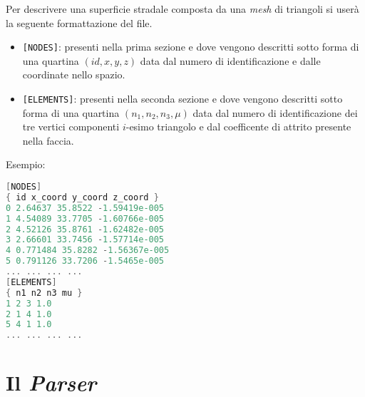 Per descrivere una superficie stradale composta da una \textit{mesh} di triangoli si userà la seguente formattazione del file.
\begin{itemize}
	\item \texttt{[NODES]}: presenti nella prima sezione e dove vengono descritti sotto forma di una quartina $(id,x,y,z)$ data dal numero di identificazione e dalle coordinate nello spazio.
	\item \texttt{[ELEMENTS]}: presenti nella seconda sezione e dove vengono descritti sotto forma di una quartina $(n_1,n_2,n_3,\mu)$ data dal numero di identificazione dei tre vertici componenti $i$-esimo triangolo e dal coefficente di attrito presente nella faccia.
\end{itemize}
Esempio:
\begin{lstlisting}[language = C++, basicstyle=\ttfamily\small, basewidth=0.55em]
[NODES]
{ id x_coord y_coord z_coord }
0 2.64637 35.8522 -1.59419e-005 
1 4.54089 33.7705 -1.60766e-005 
2 4.52126 35.8761 -1.62482e-005 
3 2.66601 33.7456 -1.57714e-005 
4 0.771484 35.8282 -1.56367e-005 
5 0.791126 33.7206 -1.5465e-005
... ... ... ...
[ELEMENTS]
{ n1 n2 n3 mu }
1 2 3 1.0 
2 1 4 1.0 
5 4 1 1.0 
... ... ... ...
\end{lstlisting}
%
\section{Il \textit{Parser}}